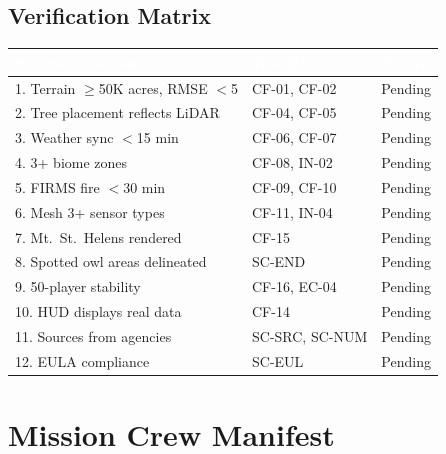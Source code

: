 \documentclass[11pt,letterpaper]{article}
\newcommand{\tableheader}[1]{\textbf{\sffamily\textcolor{white}{#1}}}
\begin{document}
\subsection{Verification Matrix}

\begin{center}
\begin{tabularx}{\textwidth}{XL{3cm}C{1.5cm}}
\toprule
{}
\tableheader{Success Criterion} & \tableheader{Test IDs} & \tableheader{Status} \\
. Terrain $\geq$50K acres, RMSE $<$5 & CF-01, CF-02 & Pending \\
2. Tree placement reflects LiDAR & CF-04, CF-05 & Pending \\
3. Weather sync $<$15 min & CF-06, CF-07 & Pending \\
4. 3+ biome zones & CF-08, IN-02 & Pending \\
5. FIRMS fire $<$30 min & CF-09, CF-10 & Pending \\
6. Mesh 3+ sensor types & CF-11, IN-04 & Pending \\
7. Mt.\ St.\ Helens rendered & CF-15 & Pending \\
8. Spotted owl areas delineated & SC-END & Pending \\
9. 50-player stability & CF-16, EC-04 & Pending \\
10. HUD displays real data & CF-14 & Pending \\
11. Sources from agencies & SC-SRC, SC-NUM & Pending \\
12. EULA compliance & SC-EUL & Pending \\
\bottomrule
\end{tabularx}
\end{center}

\section{Mission Crew Manifest}
\end{document}
